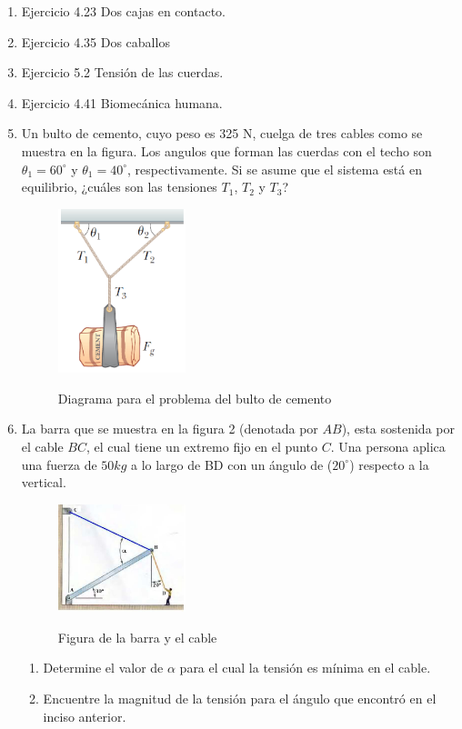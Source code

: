 \documentclass[letterpaper,10pt,onecolumn]{article}
\begin{document}
\begin{enumerate}
\item Ejercicio 4.23 Dos cajas en contacto.
\item Ejercicio 4.35 Dos caballos
\item Ejercicio 5.2  Tensión de las cuerdas. %

\item Ejercicio 4.41 Biomec\'anica humana.

\item Un bulto de cemento, cuyo peso es 325 N, cuelga de tres cables como se muestra en la figura. Los angulos que forman las cuerdas con el techo son $\theta_1=60^\circ$ y $\theta_1=40^\circ$, respectivamente. Si se asume que el sistema está en equilibrio, ¿cuáles son las tensiones $T_1$, $T_2$ y $T_3$?

\begin{figure}[hb]
\centering
\includegraphics[width=0.35\textwidth]{cemento.PNG}\\
\caption{Diagrama para el problema del bulto de cemento}
\end{figure} %

\item
La barra que se muestra en la figura 2 (denotada por $AB$), esta sostenida por el cable $BC$, el cual tiene un extremo fijo en el punto $C$. Una persona aplica una fuerza de $50kg$ a lo largo de BD con un ángulo de ($20^{\circ}$) respecto a la vertical. 
\begin{figure}[h]
\centering
\includegraphics[width=0.35\textwidth]{complementariai1.jpg}\\
\caption{Figura de la barra y el cable}
\end{figure}
\begin{enumerate}
\item 
Determine el valor de $\alpha$ para el cual la tensión es mínima en el cable.
\item
Encuentre la magnitud de la tensión para el ángulo que encontró en el inciso anterior. 
\end{enumerate}


\end{enumerate}
\end{document}

